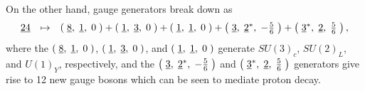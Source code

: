 \documentclass[letterpaper,12pt,titlepage,oneside,final]{book}
\begin{document}
\noindent On the other hand, gauge generators break down as
\begin{equation}\begin{array}{rcl}
\underline{24} & \mapsto &  \left(\hspace{1mm}\underline{8},\hspace{1mm}\underline{1},\hspace{1mm}0\hspace{1mm}\right) + \left(\hspace{1mm}\underline{1},\hspace{1mm}\underline{3},\hspace{1mm}0\hspace{1mm}\right) +\left(\hspace{1mm}\underline{1},\hspace{1mm}\underline{1},\hspace{1mm}0\hspace{1mm}\right) + \left(\hspace{1mm}\underline{3},\hspace{1mm}\underline{2}^*,\hspace{1mm}-\frac{5}{6}\hspace{1mm}\right)+\left(\hspace{1mm}\underline{3}^*, \hspace{1mm}\underline{2},\hspace{1mm} \frac{5}{6}\hspace{1mm}\right),
\end{array}
\end{equation}
\noindent where the $ \left(\hspace{1mm}\underline{8},\hspace{1mm}\underline{1},\hspace{1mm}0\hspace{1mm}\right) $,  $\left(\hspace{1mm}\underline{1},\hspace{1mm}\underline{3},\hspace{1mm}0\hspace{1mm}\right)$, and  $\left(\hspace{1mm}\underline{1},\hspace{1mm}\underline{1},\hspace{1mm}0\hspace{1mm}\right)$ generate $SU(3)_c$, $SU(2)_L$, and $U(1)_Y$, respectively, and the  $\left(\hspace{1mm}\underline{3},\hspace{1mm}\underline{2}^*,\hspace{1mm}-\frac{5}{6}\hspace{1mm}\right)$ and $\left(\hspace{1mm}\underline{3}^*,\hspace{1mm} \underline{2}, \hspace{1mm}\frac{5}{6}\hspace{1mm}\right)$ generators give rise to 12 new gauge bosons which can be seen to mediate proton decay.  
\end{document}
